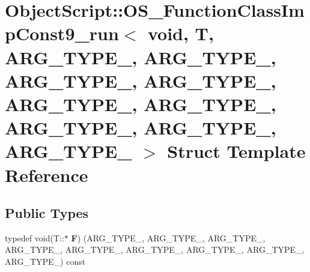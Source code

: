 \hypertarget{struct_object_script_1_1_o_s___function_class_imp_const9__run_3_01void_00_01_t_00_01_01_01_a_r_g01ce8a4af9e96d329bba5865a362071f}{}\section{Object\+Script\+:\+:O\+S\+\_\+\+Function\+Class\+Imp\+Const9\+\_\+run$<$ void, T, A\+R\+G\+\_\+\+T\+Y\+P\+E\+\_, A\+R\+G\+\_\+\+T\+Y\+P\+E\+\_, A\+R\+G\+\_\+\+T\+Y\+P\+E\+\_, A\+R\+G\+\_\+\+T\+Y\+P\+E\+\_, A\+R\+G\+\_\+\+T\+Y\+P\+E\+\_, A\+R\+G\+\_\+\+T\+Y\+P\+E\+\_, A\+R\+G\+\_\+\+T\+Y\+P\+E\+\_, A\+R\+G\+\_\+\+T\+Y\+P\+E\+\_, A\+R\+G\+\_\+\+T\+Y\+P\+E\+\_ $>$ Struct Template Reference}
\label{struct_object_script_1_1_o_s___function_class_imp_const9__run_3_01void_00_01_t_00_01_01_01_a_r_g01ce8a4af9e96d329bba5865a362071f}
\subsection*{Public Types}
\begin{DoxyCompactItemize}
\item 
typedef void(T\+::$\ast$ {\bfseries F}) (A\+R\+G\+\_\+\+T\+Y\+P\+E\+\_, A\+R\+G\+\_\+\+T\+Y\+P\+E\+\_, A\+R\+G\+\_\+\+T\+Y\+P\+E\+\_, A\+R\+G\+\_\+\+T\+Y\+P\+E\+\_, A\+R\+G\+\_\+\+T\+Y\+P\+E\+\_, A\+R\+G\+\_\+\+T\+Y\+P\+E\+\_, A\+R\+G\+\_\+\+T\+Y\+P\+E\+\_, A\+R\+G\+\_\+\+T\+Y\+P\+E\+\_, A\+R\+G\+\_\+\+T\+Y\+P\+E\+\_) const \hypertarget{struct_object_script_1_1_o_s___function_class_imp_const9__run_3_01void_00_01_t_00_01_01_01_a_r_g01ce8a4af9e96d329bba5865a362071f_a78d76a3ee6bfa3e8c0b59f0ff2ccbb20}{}\label{struct_object_script_1_1_o_s___function_class_imp_const9__run_3_01void_00_01_t_00_01_01_01_a_r_g01ce8a4af9e96d329bba5865a362071f_a78d76a3ee6bfa3e8c0b59f0ff2ccbb20}

\end{DoxyCompactItemize}
